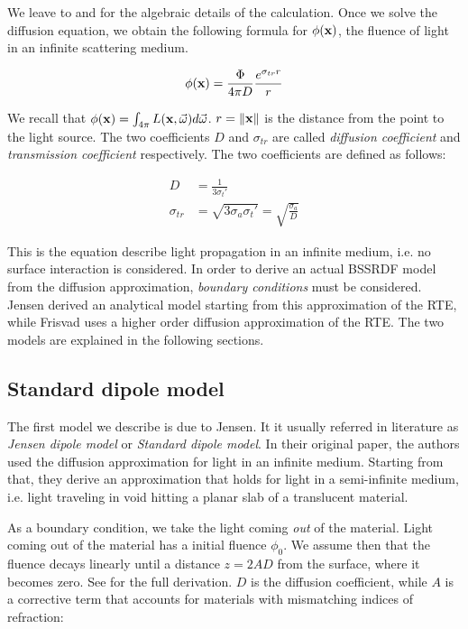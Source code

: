 We leave to \cite{books/daglib/0093591} and \cite{Jensen:2001:PMS:383259.383319} for the algebraic details of the calculation. Once we solve the diffusion equation, we obtain the following formula for $\phi(\mathbf{x})$, the fluence of light in an infinite scattering medium.

$$
\phi(\mathbf{x}) = \frac{\Phi}{4\pi D} \frac{e^{\sigma_{tr} r}}{r}
\label{eq:dasimple}
$$

We recall that $\phi(\mathbf{x}) = \int_{4\pi}L(\mathbf{x},\vec{\omega}) d\vec{\omega}$. $r = \|\mathbf{x}\|$ is the distance from the point to the light source. The two coefficients $D$ and $\sigma_{tr}$ are called \emph{diffusion coefficient} and \emph{transmission coefficient} respectively. The two coefficients are defined as follows:

\begin{equation*}
\begin{split}
D &= \frac{1}{3 \sigma_t'} \\
\sigma_{tr} &= \sqrt{3 \sigma_a \sigma_t'} = \sqrt{\frac{\sigma_a}{D}}
\end{split}
\end{equation*}

This is the equation describe light propagation in an infinite medium, i.e. no surface interaction is considered. In order to derive an actual BSSRDF model from the diffusion approximation, \emph{boundary conditions} must be considered. Jensen \cite{Jensen:2001:PMS:383259.383319} derived an analytical model starting from this approximation of the RTE, while Frisvad \cite{IMM2013-06646} uses a higher order diffusion approximation of the RTE. The two models are explained in the following sections.

\subsection{Standard dipole model}

 
The first model we describe is due to Jensen\cite{Jensen:2001:PMS:383259.383319}. It it usually referred in literature as \emph{Jensen dipole model} or \emph{Standard dipole model}. In their original paper, the authors used the diffusion approximation for light in an infinite medium. Starting from that, they derive an approximation that holds for light in a semi-infinite medium, i.e. light traveling in void hitting a planar slab of a translucent material.

As a boundary condition, we take the light coming \emph{out} of the material. Light coming out of the material has a initial fluence $\phi_0$. We assume then that the fluence decays linearly until a distance $z = 2 A D$ from the surface, where it becomes zero. See \cite{Donner:2006:TRI:1236937} for the full derivation. $D$ is the diffusion coefficient, while $A$ is a corrective term that accounts for materials with mismatching indices of refraction:

